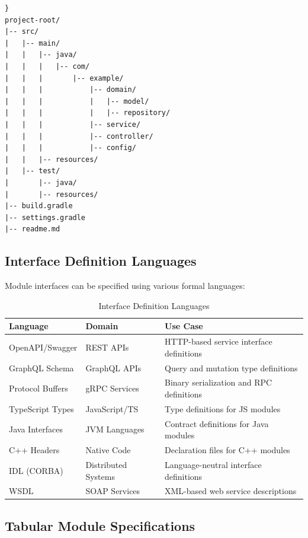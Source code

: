 \documentclass[11pt,letterpaper]{article}
\begin{document}
\begin{verbatim}}
project-root/
|-- src/
|   |-- main/
|   |   |-- java/
|   |   |   |-- com/
|   |   |       |-- example/
|   |   |           |-- domain/
|   |   |           |   |-- model/
|   |   |           |   |-- repository/
|   |   |           |-- service/
|   |   |           |-- controller/
|   |   |           |-- config/
|   |   |-- resources/
|   |-- test/
|       |-- java/
|       |-- resources/
|-- build.gradle
|-- settings.gradle
|-- readme.md
\end{verbatim}

\subsection{Interface Definition Languages}

Module interfaces can be specified using various formal languages:

\begin{table}[H]
\centering
\caption{Interface Definition Languages}
\small
\begin{tabular}{@{}L{3.1cm}L{3cm}L{\dimexpr\linewidth-6.1cm-4\tabcolsep\relax}@{}}
\toprule
\textbf{Language} & \textbf{Domain} & \textbf{Use Case} \\
\midrule
OpenAPI/Swagger & REST APIs & HTTP-based service interface definitions \\
GraphQL Schema & GraphQL APIs & Query and mutation type definitions \\
Protocol Buffers & gRPC Services & Binary serialization and RPC definitions \\
TypeScript Types & JavaScript/TS & Type definitions for JS modules \\
Java Interfaces & JVM Languages & Contract definitions for Java modules \\
C++ Headers & Native Code & Declaration files for C++ modules \\
IDL (CORBA) & Distributed Systems & Language-neutral interface definitions \\
WSDL & SOAP Services & XML-based web service descriptions \\
\bottomrule
\end{tabular}
\end{table}

\subsection{Tabular Module Specifications}
\end{document}
